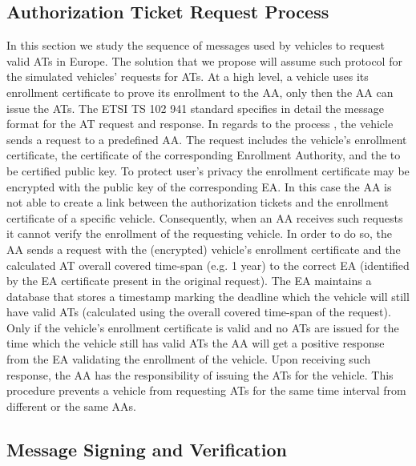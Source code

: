\subsection{Authorization Ticket Request Process} \label{auth_process}
In this section we study the sequence of messages used by vehicles to request valid ATs in Europe. The solution that we propose will assume such protocol for the simulated vehicles' requests for ATs.
At a high level, a vehicle uses its enrollment certificate to prove its enrollment to the AA, only then the AA can issue the ATs.
The ETSI TS 102 941 \cite{etsi_privacy} standard specifies in detail the message format for the AT request and response. In regards to the process \cite{generic_eu}, the vehicle sends a request to a predefined AA. The request includes the vehicle's enrollment certificate, the certificate of the corresponding Enrollment Authority, and the to be certified public key. To protect user's privacy the enrollment certificate may be encrypted with the public key of the corresponding EA. In this case the AA is not able to create a link between the authorization tickets and the enrollment certificate of a specific vehicle. Consequently, when an AA receives such requests it cannot verify the enrollment of the requesting vehicle. In order to do so, the AA sends a request with the (encrypted) vehicle's enrollment certificate and the calculated AT overall covered time-span (e.g. 1 year) to the correct EA (identified by the EA certificate present in the original request). The EA maintains a database that stores a timestamp marking the deadline which the vehicle will still have valid ATs (calculated using the overall covered time-span of the request). Only if the vehicle's enrollment certificate is valid and no ATs are issued for the time which the vehicle still has valid ATs the AA will get a positive response from the EA validating the enrollment of the vehicle. Upon receiving such response, the AA has the responsibility of issuing the ATs for the vehicle. This procedure prevents a vehicle from requesting ATs for the same time interval from different or the same AAs.


\subsection{Message Signing and Verification}

